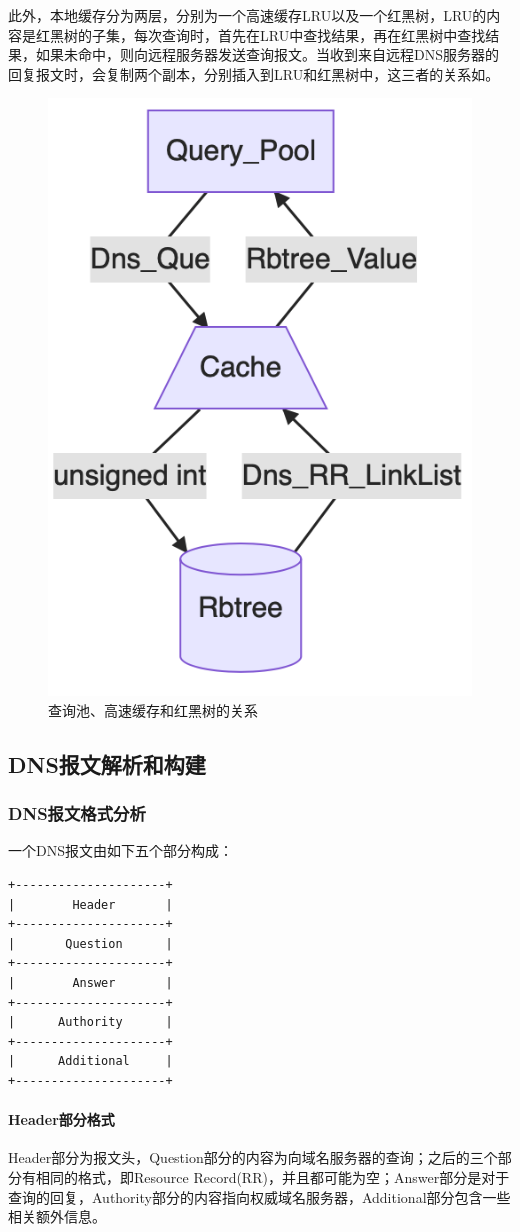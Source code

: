 \documentclass[lang=cn,11pt,a4paper,cite=authornum]{paper}
\begin{document}
此外，本地缓存分为两层，分别为一个高速缓存LRU以及一个红黑树，LRU的内容是红黑树的子集，每次查询时，首先在LRU中查找结果，再在红黑树中查找结果，如果未命中，则向远程服务器发送查询报文。当收到来自远程DNS服务器的回复报文时，会复制两个副本，分别插入到LRU和红黑树中，这三者的关系如。

\begin{figure}[htbp]

    \centering
    \includegraphics[width=0.3\linewidth]{./Images/structure3.png}
    \caption{查询池、高速缓存和红黑树的关系\label{fig:structure3}}

\end{figure}

\subsection{DNS报文解析和构建}

\subsubsection{DNS报文格式分析}

一个DNS报文由如下五个部分构成：

\begin{code}
\begin{verbatim}
+---------------------+
|        Header       |
+---------------------+
|       Question      |
+---------------------+
|        Answer       |
+---------------------+
|      Authority      |
+---------------------+
|      Additional     |
+---------------------+
\end{verbatim}
\end{code}

\paragraph{Header部分格式}

Header部分为报文头，Question部分的内容为向域名服务器的查询；之后的三个部分有相同的格式，即Resource Record(RR)，并且都可能为空；Answer部分是对于查询的回复，Authority部分的内容指向权威域名服务器，Additional部分包含一些相关额外信息。
\end{document}

